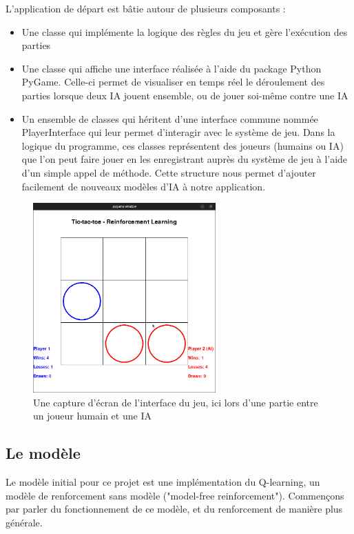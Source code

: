 \documentclass[french]{article}
\begin{document}
    L'application de départ est bâtie autour de plusieurs composants :
    \begin{itemize}
        \item Une classe qui implémente la logique des règles du jeu et gère l'exécution des parties
        \item Une classe qui affiche une interface réalisée à l'aide du package Python PyGame. Celle-ci permet de visualiser en temps réel le déroulement des parties lorsque deux IA jouent ensemble, ou de jouer soi-même contre une IA
        \item Un ensemble de classes qui héritent d'une interface commune nommée PlayerInterface qui leur permet d'interagir avec le système de jeu. Dans la logique du programme, ces classes représentent des joueurs (humains ou IA) que l'on peut faire jouer en les enregistrant auprès du système de jeu à l'aide d'un simple appel de méthode. Cette structure nous permet d'ajouter facilement de nouveaux modèles d'IA à notre application.
    \end{itemize}

    \begin{figure}[h]
        \includegraphics[width=7cm]{game_screenshot}
        \centering
        \caption{Une capture d'écran de l'interface du jeu, ici lors d'une partie entre un joueur humain et une IA}
        \centering
    \end{figure}

    \subsection{Le modèle}
    Le modèle initial pour ce projet est une implémentation du Q-learning, un modèle de renforcement sans modèle ("model-free reinforcement"). Commençons par parler du fonctionnement de ce modèle, et du renforcement de manière plus générale.
\end{document}
